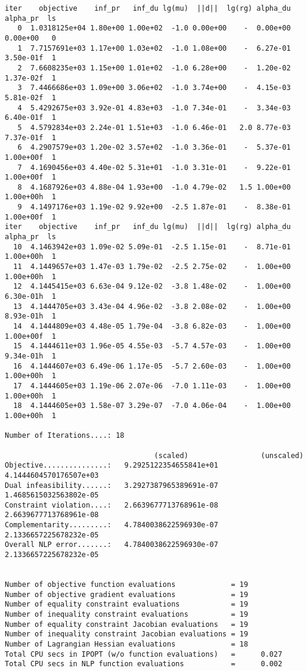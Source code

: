 \begin{lstlisting}
iter    objective    inf_pr   inf_du lg(mu)  ||d||  lg(rg) alpha_du alpha_pr  ls
   0  1.0318125e+04 1.80e+00 1.00e+02  -1.0 0.00e+00    -  0.00e+00 0.00e+00   0
   1  7.7157691e+03 1.17e+00 1.03e+02  -1.0 1.08e+00    -  6.27e-01 3.50e-01f  1
   2  7.6608235e+03 1.15e+00 1.01e+02  -1.0 6.28e+00    -  1.20e-02 1.37e-02f  1
   3  7.4466686e+03 1.09e+00 3.06e+02  -1.0 3.74e+00    -  4.15e-03 5.81e-02f  1
   4  5.4292675e+03 3.92e-01 4.83e+03  -1.0 7.34e-01    -  3.34e-03 6.40e-01f  1
   5  4.5792834e+03 2.24e-01 1.51e+03  -1.0 6.46e-01   2.0 8.77e-03 7.37e-01f  1
   6  4.2907579e+03 1.20e-02 3.57e+02  -1.0 3.36e-01    -  5.37e-01 1.00e+00f  1
   7  4.1690456e+03 4.40e-02 5.31e+01  -1.0 3.31e-01    -  9.22e-01 1.00e+00f  1
   8  4.1687926e+03 4.88e-04 1.93e+00  -1.0 4.79e-02   1.5 1.00e+00 1.00e+00h  1
   9  4.1497176e+03 1.19e-02 9.92e+00  -2.5 1.87e-01    -  8.38e-01 1.00e+00f  1
iter    objective    inf_pr   inf_du lg(mu)  ||d||  lg(rg) alpha_du alpha_pr  ls
  10  4.1463942e+03 1.09e-02 5.09e-01  -2.5 1.15e-01    -  8.71e-01 1.00e+00h  1
  11  4.1449657e+03 1.47e-03 1.79e-02  -2.5 2.75e-02    -  1.00e+00 1.00e+00h  1
  12  4.1445415e+03 6.63e-04 9.12e-02  -3.8 1.48e-02    -  1.00e+00 6.30e-01h  1
  13  4.1444705e+03 3.43e-04 4.96e-02  -3.8 2.08e-02    -  1.00e+00 8.93e-01h  1
  14  4.1444809e+03 4.48e-05 1.79e-04  -3.8 6.82e-03    -  1.00e+00 1.00e+00f  1
  15  4.1444611e+03 1.96e-05 4.55e-03  -5.7 4.57e-03    -  1.00e+00 9.34e-01h  1
  16  4.1444607e+03 6.49e-06 1.17e-05  -5.7 2.60e-03    -  1.00e+00 1.00e+00h  1
  17  4.1444605e+03 1.19e-06 2.07e-06  -7.0 1.11e-03    -  1.00e+00 1.00e+00h  1
  18  4.1444605e+03 1.58e-07 3.29e-07  -7.0 4.06e-04    -  1.00e+00 1.00e+00h  1

Number of Iterations....: 18

                                   (scaled)                 (unscaled)
Objective...............:   9.2925122354655841e+01    4.1444604570176507e+03
Dual infeasibility......:   3.2927387965389691e-07    1.4685615032563802e-05
Constraint violation....:   2.6639677713768961e-08    2.6639677713768961e-08
Complementarity.........:   4.7840038622596930e-07    2.1336657225678232e-05
Overall NLP error.......:   4.7840038622596930e-07    2.1336657225678232e-05


Number of objective function evaluations             = 19
Number of objective gradient evaluations             = 19
Number of equality constraint evaluations            = 19
Number of inequality constraint evaluations          = 19
Number of equality constraint Jacobian evaluations   = 19
Number of inequality constraint Jacobian evaluations = 19
Number of Lagrangian Hessian evaluations             = 18
Total CPU secs in IPOPT (w/o function evaluations)   =      0.027
Total CPU secs in NLP function evaluations           =      0.002


\end{lstlisting}
